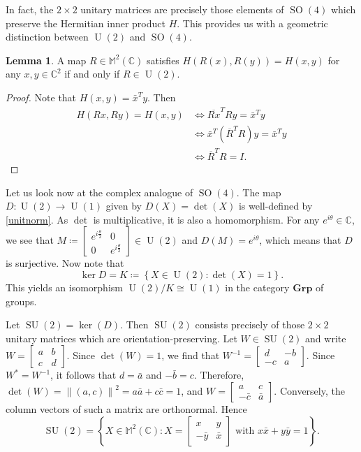 \documentclass[10pt,letterpaper,cm]{nupset}
\theoremstyle{definition}
\theoremstyle{theorem}
\newtheorem{lemma}[definition]{Lemma}
\theoremstyle{remark}
\newcommand{\C}{\mathbb C}
\newcommand{\M}{\mathbb M}
\newcommand{\1}{\mathbf{1}}
\newcommand{\0}{\vec {0}}
\DeclareMathOperator{\SO}{SO}
\DeclareMathOperator{\SU}{SU}
\DeclareMathOperator{\U}{U}
\begin{document}
In fact, the  $2\times 2$ unitary matrices are precisely those elements of $\SO(4)$ which preserve the Hermitian inner product $H$. This provides us with a geometric distinction between $\U(2)$ and $\SO(4)$.

\begin{lemma}\label{l18}
A map $R\in \M^2(\C)$ satisfies $H(R(x), R(y))=H(x,y)$ for any $x,y\in \C^2$ if and only if  $R\in \U(2)$.
\end{lemma}

\begin{proof}
Note that $H(x,y)=\bar{x}^Ty$. Then 
\begin{align*}
H(Rx, Ry)=H(x,y) & \iff \overline{Rx}^TRy=\bar{x}^Ty
\\ & \iff \bar{x}^T(\overline{R}^TR)y=\bar{x}^Ty 
\\ & \iff \overline{R}^TR =I.
\end{align*}
\end{proof}

\smallskip

Let us look now at the complex analogue of $\SO(4)$. The map $D:\U(2)\to \U(1)$ given by $D(X)=\det(X)$ is well-defined by \cref{unitnorm}. As $\det$ is multiplicative, it is also a homomorphism. For any $e^{i\theta}\in \C$, we see that $M\coloneqq\begin{bmatrix}e^{i\frac{\theta}{2}} & 0 \\ 0 & e^{i\frac{\theta}{2}} \end{bmatrix}\in \U(2)$ and $D(M)=e^{i\theta}$, which means that $D$ is surjective. Now note that $$\ker D=K\coloneqq\left\{X\in \U(2) :\det(X)=1\right\}.$$ This yields an isomorphism $\U(2)/K\cong \U(1)$ in the category $\mathbf{Grp}$ of groups. 

Let $\SU(2)= \ker(D)$. Then $\SU(2)$ consists precisely of those $2\times 2$ unitary matrices which are orientation-preserving.
Let $W\in \SU(2)$ and write $W=\begin{bmatrix} a & b \\ c & d \end{bmatrix}$. Since $\det(W)=1$, we find that $W^{-1}=\begin{bmatrix} d & {-b} \\ {-c} & a \end{bmatrix}$. Since $W^\ast= W^{-1}$, it follows that $d=\bar{a}$ and ${-\bar{b}} ={c}$. Therefore, $\det(W)= \left\lVert{(a,c)}\right\rVert^2=a\bar{a}+c\bar{c}=1$, and $W=\begin{bmatrix} a & c\\ {-\bar{c}} & \bar{a} \end{bmatrix}$. Conversely, the column vectors of such a matrix are orthonormal. Hence $$\SU(2)= \left\{X\in \M^2(\C): X=  \begin{bmatrix} x & {y}\\ {-\bar{y}} & \bar{x} \end{bmatrix} \text{ with } x\bar{x}+y\bar{y}=1\right\}.$$
\end{document}
